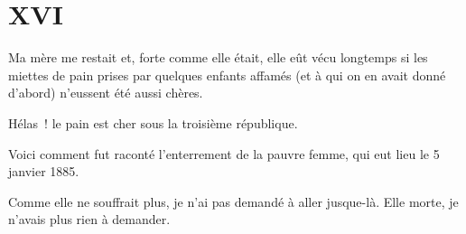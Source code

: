 \documentclass[french,twoside]{book} %
\newcommand\chapteropen{} %
\newcommand\chaptercont{} %
\newcommand\chapterclose{} %
\begin{document}
\chapterclose


\chapteropen
 \chapter[{XVI}]{XVI}
\label{p2.16}

\chaptercont
\noindent Ma mère me restait et, forte comme elle était, elle eût vécu longtemps si les miettes de pain prises par quelques enfants affamés (et à qui on en avait donné d’abord) n’eussent été aussi chères.\par
Hélas ! le pain est cher sous la troisième république.\par
Voici comment fut raconté l’enterrement de la pauvre femme, qui eut lieu le 5 janvier 1885.\par
Comme elle ne souffrait plus, je n’ai pas demandé à aller jusque-là. Elle morte, je n’avais plus rien à demander.\par
\end{document}
